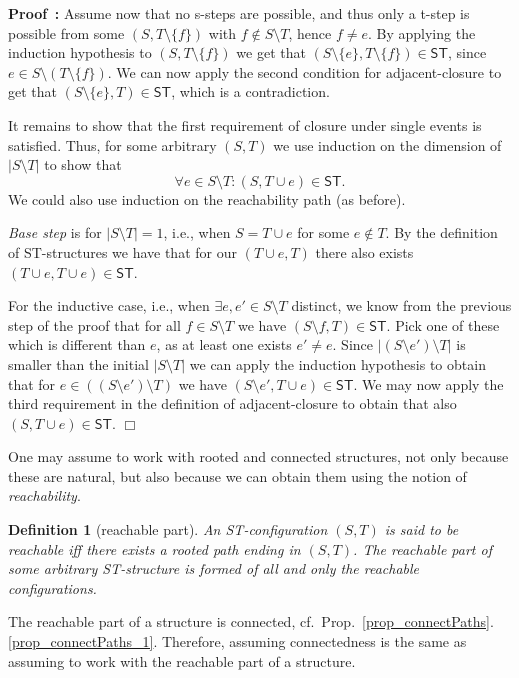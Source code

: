 \documentclass[submission,copyright,creativecommons]{eptcs}
\newtheorem{definition}[theorem]{Definition}
\newenvironment{proof}[1][\!\!\,]{\vspace{1ex}\noindent\textbf{Proof #1: }}{\hfill$\Box$\vspace{2ex}}
\newcounter{case}
\newcommand\ST{\ensuremath{\mathsf{ST}}}
\newcommand\ststruct{\ensuremath{\ST}}
\begin{document}
\begin{proof}
Assume now that no s-steps are possible, and thus only a t-step is possible from some $(S,T\setminus\{f\})$ with $f\not\in S\setminus T$, hence $f\neq e$. By applying the induction hypothesis to $(S,T\setminus\{f\})$ we get that $(S\setminus\{e\},T\setminus\{f\})\in\ststruct$, since $e\in S\setminus(T\setminus\{f\})$. We can now apply the second condition for adjacent-closure to get that $(S\setminus\{e\},T)\in\ststruct$, which is a contradiction.

It remains to show that the first requirement of closure under single events is satisfied.
Thus, for some arbitrary $(S,T)$ we use induction on the dimension of $|S\setminus T|$ to show that 
\[
\forall e\in S\setminus T:(S,T\cup e)\in\ST.
\]
We could also use induction on the reachability path (as before).

\textit{Base step} is for $|S\setminus T|=1$, i.e., when $S=T\cup e$ for some $e\not\in T$. By the definition of ST-structures we have that for our $(T\cup e,T)$ there also exists $(T\cup e,T\cup e)\in\ST$.

For the inductive case, i.e., when $\exists e,e'\in S\setminus T$ distinct, we know from the previous step of the proof that for all $f\in S\setminus T$ we have $(S\setminus f,T)\in\ST$. Pick one of these which is different than $e$, as at least one exists $e'\neq e$. Since $|(S\setminus e')\setminus T|$ is smaller than the initial $|S\setminus T|$ we can apply the induction hypothesis to obtain that for $e\in ((S\setminus e')\setminus T)$ we have $(S\setminus e',T\cup e)\in\ST$. We may now apply the third requirement in the definition of adjacent-closure to obtain that also $(S,T\cup e)\in\ST$.
\end{proof}



One may assume to work with rooted and connected structures, not only because these are natural, but also because we can obtain them using the notion of \textit{reachability}.



\begin{definition}[reachable part]\label{def_reachability}
An ST-configuration $(S,T)$ is said to be \emph{reachable} iff there exists a rooted path ending in $(S,T)$. The \emph{reachable part} of some arbitrary ST-structure is formed of all and only the reachable configurations. 
\end{definition}

The reachable part of a structure is connected, cf.~Prop.~\ref{prop_connectPaths}.\ref{prop_connectPaths_1}. Therefore, assuming connectedness is the same as assuming to work with the reachable part of a structure. 
\end{document}
